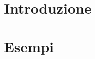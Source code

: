 \documentclass[a4paper, 11pt]{book}
\theoremstyle{plain}
\theoremstyle{definition}
\numberwithin{equation}{chapter}
\numberwithin{figure}{chapter}
\numberwithin{table}{chapter}
\begin{document}
\mainmatter




\chapter{Introduzione}



\chapter{Esempi}

\lipsum[2]


\end{document}
